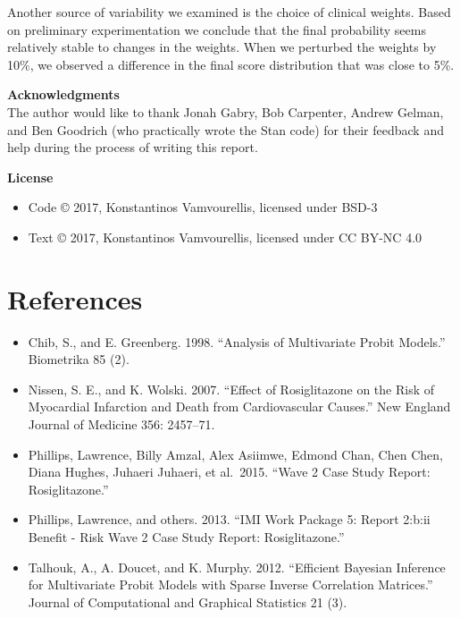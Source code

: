 \documentclass[11pt]{article}
\providecommand{\tightlist}{%
      \setlength{\itemsep}{0pt}\setlength{\parskip}{0pt}}
\begin{document}
Another source of variability we examined is the choice of clinical
weights. Based on preliminary experimentation we conclude that the final
probability seems relatively stable to changes in the weights. When we
perturbed the weights by 10\%, we observed a difference in the final
score distribution that was close to 5\%.

\textbf{Acknowledgments}\\
The author would like to thank Jonah Gabry, Bob Carpenter, Andrew
Gelman, and Ben Goodrich (who practically wrote the Stan code) for their
feedback and help during the process of writing this report.

\textbf{License}

\begin{itemize}
\tightlist
\item
  Code © 2017, Konstantinos Vamvourellis, licensed under BSD-3\\
\item
  Text © 2017, Konstantinos Vamvourellis, licensed under CC BY-NC 4.0
\end{itemize}

    \hypertarget{references}{%
\section{References}\label{references}}

\begin{itemize}
\item
  Chib, S., and E. Greenberg. 1998. ``Analysis of Multivariate Probit
  Models.'' Biometrika 85 (2).
\item
  Nissen, S. E., and K. Wolski. 2007. ``Effect of Rosiglitazone on the
  Risk of Myocardial Infarction and Death from Cardiovascular Causes.''
  New England Journal of Medicine 356: 2457--71.
\item
  Phillips, Lawrence, Billy Amzal, Alex Asiimwe, Edmond Chan, Chen Chen,
  Diana Hughes, Juhaeri Juhaeri, et al.~2015. ``Wave 2 Case Study
  Report: Rosiglitazone.''
\item
  Phillips, Lawrence, and others. 2013. ``IMI Work Package 5: Report
  2:b:ii Benefit - Risk Wave 2 Case Study Report: Rosiglitazone.''
\item
  Talhouk, A., A. Doucet, and K. Murphy. 2012. ``Efficient Bayesian
  Inference for Multivariate Probit Models with Sparse Inverse
  Correlation Matrices.'' Journal of Computational and Graphical
  Statistics 21 (3).
\end{itemize}


    
    
    
    
\end{document}
